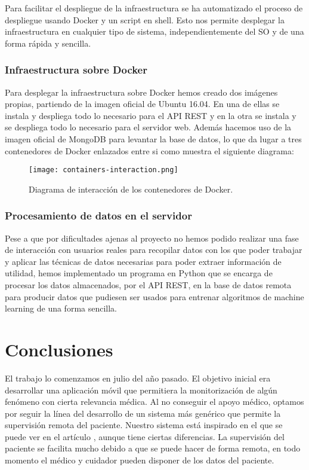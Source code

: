 \documentclass[11pt,spanish]{article}
\begin{document}
Para facilitar el despliegue de la infraestructura se ha automatizado el proceso de despliegue usando Docker y un script en shell. Esto nos permite desplegar la infraestructura en cualquier tipo de sistema, independientemente del SO y de una forma rápida y sencilla.

\subsubsection{Infraestructura sobre Docker}
Para desplegar la infraestructura sobre Docker hemos creado dos imágenes propias, partiendo de la imagen oficial de Ubuntu 16.04. En una de ellas se instala y despliega todo lo necesario para el API REST y en la otra se instala y se despliega todo lo necesario para el servidor web. Además hacemos uso de la imagen oficial de MongoDB para levantar la base de datos, lo que da lugar a tres contenedores de Docker enlazados entre si como muestra el siguiente diagrama:

\begin{figure}[H]
  \centering
  \texttt{[image: containers-interaction.png]}
  \caption{Diagrama de interacción de los contenedores de Docker.}
\end{figure}
\newpage

\subsubsection{Procesamiento de datos en el servidor}

Pese a que por dificultades ajenas al proyecto no hemos podido realizar una fase de interacción con usuarios reales para recopilar datos con los que poder trabajar y aplicar las técnicas de datos necesarias para poder extraer información de utilidad, hemos implementado un programa en Python que se encarga de procesar los datos almacenados, por el API REST, en la base de datos remota para producir datos que pudiesen ser usados para entrenar algoritmos de machine learning de una forma sencilla.

\section{Conclusiones}
El trabajo lo comenzamos en julio del año pasado. El objetivo inicial era desarrollar una aplicación móvil que permitiera la monitorización de algún fenómeno con cierta relevancia médica. Al no conseguir el apoyo médico, optamos por seguir la línea del desarrollo de un sistema más genérico que permite la supervisión remota del paciente. Nuestro sistema está inspirado en el que se puede ver en el artículo \cite{resumen1}, aunque tiene ciertas diferencias. La supervisión del paciente se facilita mucho debido a que se puede hacer de forma remota, en todo momento el médico y cuidador pueden disponer de los datos del paciente.
\newline
\end{document}
